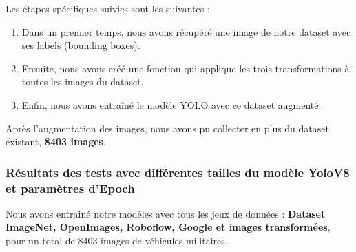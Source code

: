 \noindent Les étapes spécifiques suivies sont les suivantes :

\begin{enumerate}
    \item Dans un premier temps, nous avons récupéré une image de notre dataset avec ses labels (bounding boxes).
    \item Ensuite, nous avons créé une fonction qui applique les trois transformations à toutes les images du dataset.
    \item Enfin, nous avons entraîné le modèle YOLO avec ce dataset augmenté.
\end{enumerate}

Après l'augmentation des images, nous avons pu collecter en plus du dataset existant, \textbf{8403 images}.\\


\subsubsection*{Résultats des tests avec différentes tailles du modèle YoloV8 et paramètres d'Epoch}
Nous avons entrainé notre modèles avec tous les jeux de données :
\textbf{Dataset ImageNet, OpenImages, Roboflow, Google et images transformées}, pour un total de 8403 images de véhicules militaires.

